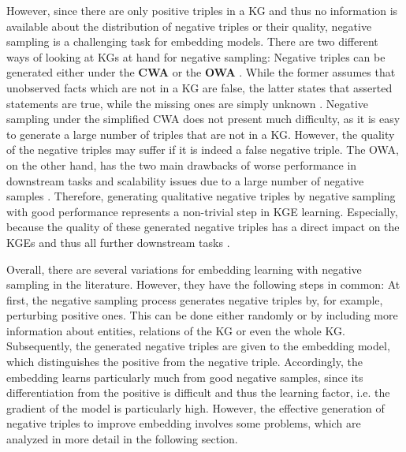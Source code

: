 However, since there are only positive triples in a \ac{KG} and thus no information is available about the distribution of negative triples or their quality, negative sampling is a challenging task for embedding models.
There are two different ways of looking at \acp{KG} at hand for negative sampling:
Negative triples can be generated either under the \textbf{\ac{CWA}} or the \textbf{\ac{OWA}} \cite{qiannegative}.
While the former assumes that unobserved facts which are not in a \ac{KG} are false, the latter states that asserted statements are true, while the missing ones are simply unknown \cite{arnaout2020enriching, qiannegative}.
Negative sampling under the simplified \ac{CWA} does not present much difficulty, as it is easy to generate a large number of triples that are not in a \ac{KG}.
However, the quality of the negative triples may suffer if it is indeed a false negative triple.
The \ac{OWA}, on the other hand, has the two main drawbacks of worse performance in downstream tasks and scalability issues due to a large number of negative samples \cite{qiannegative}.
Therefore, generating qualitative negative triples by negative sampling with good performance represents a non-trivial step in \ac{KGE} learning.
Especially, because the quality of these generated negative triples has a direct impact on the \acp{KGE} and thus all further downstream tasks \cite{qiannegative}.

Overall, there are several variations for embedding learning with negative sampling in the literature.
However, they have the following steps in common:
At first, the negative sampling process generates negative triples by, for example, perturbing positive ones.
This can be done either randomly or by including more information about entities, relations of the \ac{KG} or even the whole \ac{KG}.
Subsequently, the generated negative triples are given to the embedding model, which distinguishes the positive from the negative triple.
Accordingly, the embedding learns particularly much  from good negative samples, since its differentiation from the positive is difficult and thus the learning factor, i.e. the gradient of the model is particularly high.
However, the effective generation of negative triples to improve embedding involves some problems, which are analyzed in more detail in the following section.





